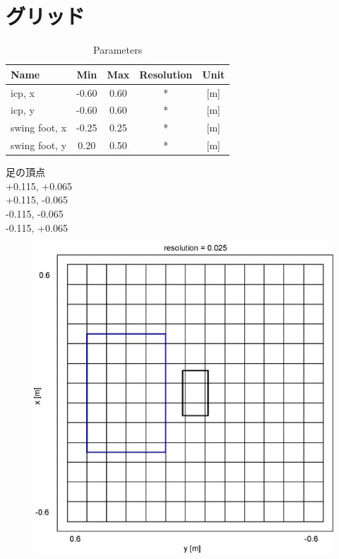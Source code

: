 \documentclass[main]{subfiles}
\begin{document}
\section{グリッド}
\begin{table}[H]
  \centering
  \caption{Parameters}
  \begin{tabular}{lcccc}
		\hline
    \textbf{Name} & \textbf{Min} & \textbf{Max} & \textbf{Resolution} & \textbf{Unit} \\ \hline \hline
    icp, x        & -0.60 & 0.60 & * & [m] \\
    icp, y        & -0.60 & 0.60 & * & [m] \\
    swing foot, x & -0.25 & 0.25 & * & [m] \\
    swing foot, y &  0.20 & 0.50 & * & [m] \\
    \hline
  \end{tabular}
\end{table}
足の頂点\\
+0.115, +0.065\\
+0.115, -0.065\\
-0.115, -0.065\\
-0.115, +0.065\\
\begin{figure}[H]
  \centering
  \includegraphics[width = 100 mm]{graph/grid/0.1.eps}
\end{figure}
\end{document}
